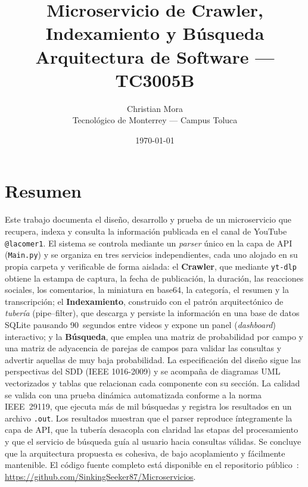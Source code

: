 \documentclass[11pt]{article}
\title{\textbf{Microservicio de Crawler, Indexamiento y B\'usqueda}\\
\large Arquitectura de Software --- TC3005B}
\author{Christian Mora \\ Tecnol\'ogico de Monterrey --- Campus Toluca}
\date{\today}
\begin{document}
\maketitle

\begin{acronym}
\end{acronym}

\section{Resumen}\label{sec:resumen}
Este trabajo documenta el dise\~no, desarrollo y prueba de un microservicio
que recupera, indexa y consulta la informaci\'on publicada en el canal de
YouTube \texttt{@lacomer1}. El sistema se controla mediante un \emph{parser}
\'unico en la capa de \ac{API} (\texttt{Main.py}) y se organiza en tres
servicios independientes, cada uno alojado en su propia carpeta y verificable
de forma aislada: el \textbf{Crawler}, que mediante \texttt{yt-dlp} obtiene la
estampa de captura, la fecha de publicaci\'on, la duraci\'on, las reacciones
sociales, los comentarios, la miniatura en base64, la categor\'ia, el resumen
y la transcripci\'on; el \textbf{Indexamiento}, construido con el patr\'on
arquitect\'onico de \emph{tuber\'ia} (pipe--filter), que descarga y persiste la
informaci\'on en una base de datos SQLite pausando 90~segundos entre videos y
expone un panel (\emph{dashboard}) interactivo; y la \textbf{B\'usqueda}, que
emplea una matriz de probabilidad por campo y una matriz de adyacencia de
parejas de campos para validar las consultas y advertir aquellas de muy baja
probabilidad. La especificaci\'on del dise\~no sigue las perspectivas del
\ac{SDD} (IEEE 1016-2009) y se acompa\~na de diagramas \ac{UML} vectorizados y
tablas que relacionan cada componente con su secci\'on. La calidad se valida con una prueba
din\'amica automatizada conforme a la norma IEEE~29119, que ejecuta m\'as de
mil b\'usquedas y registra los resultados en un archivo \texttt{.out}. Los
resultados muestran que el parser reproduce \'integramente la capa de \ac{API},
que la tuber\'ia desacopla con claridad las etapas del procesamiento y que el
servicio de b\'usqueda gu\'ia al usuario hacia consultas v\'alidas. Se concluye
que la arquitectura propuesta es cohesiva, de bajo acoplamiento y f\'acilmente
mantenible. El c\'odigo fuente completo est\'a disponible en el repositorio
p\'ublico~\cite{repo}: \url{https://github.com/SinkingSeeker87/Microservicios}.
\end{document}
